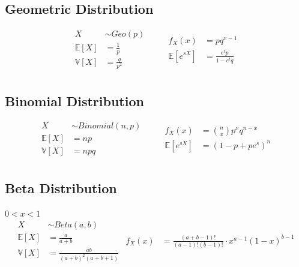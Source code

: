 \documentclass[12pt]{article}
\begin{document}
    \subsection{Geometric Distribution}
    \begin{equation*}
        \begin{aligned}
            X &\sim Geo(p) \qquad\\
            \mathbb{E}[X] &= \frac{1}{p} \\
            \mathbb{V}[X] &= \frac{q}{p^2} \\
        \end{aligned}
        \begin{aligned}
            f_X(x) &= pq^{x-1}              \\
            \mathbb{E}[e^{sX}] &= \frac{e^tp}{1 - e^tq} \\
        \end{aligned}
    \end{equation*}

    \subsection{Binomial Distribution}
    \begin{equation*}
        \begin{aligned}
            X &\sim Binomial(n, p) \qquad\\
            \mathbb{E}[X] &= np \\
            \mathbb{V}[X] &= npq \\
        \end{aligned}
        \begin{aligned}
            f_X(x) &= \binom{n}{x} p^x q^{n-x} \\
            \mathbb{E}[e^{sX}] &= (1 - p + pe^s)^n \\
        \end{aligned}
    \end{equation*}

    \subsection{Beta Distribution}
    \(0 < x < 1\)
    \begin{equation*}
        \begin{aligned}
            X &\sim Beta(a, b) \qquad\\
            \mathbb{E}[X] &= \frac{a}{a + b} \\
            \mathbb{V}[X] &= \frac{ab}{(a + b)^2(a + b + 1)}\\
        \end{aligned}
        \begin{aligned}
            f_X(x) &= \frac{(a + b - 1)!}{(a - 1)! (b - 1)!} \cdot x^{a-1} (1 - x)^{b-1} \\
        \end{aligned}
    \end{equation*}
\end{document}
